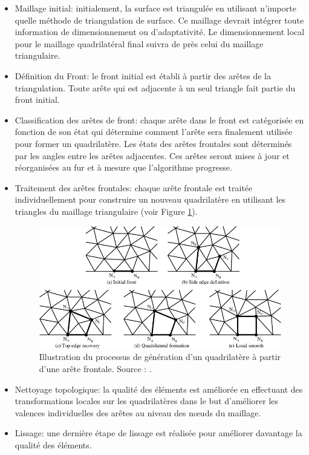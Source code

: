 \begin{itemize}
    \item Maillage initial: initialement, la surface est triangulée en utilisant n'importe quelle méthode de triangulation de surface. Ce maillage devrait intégrer toute information de dimensionnement ou d'adaptativité. Le dimensionnement local pour le maillage quadrilatéral final suivra de près celui du maillage triangulaire.\\

    \item Définition du Front: le front initial est établi à partir des arêtes de la triangulation. Toute arête qui est adjacente à un seul triangle fait partie du front initial.\\

    \item Classification des arêtes de front: chaque arête dans le front est catégorisée en fonction de son état qui détermine comment l'arête sera finalement utilisée pour former un quadrilatère. Les états des arêtes frontales sont déterminés par les angles entre les arêtes adjacentes. Ces arêtes seront mises à jour et réorganisées au fur et à mesure que l'algorithme progresse.\\

    \item Traitement des arêtes frontales: chaque arête frontale est traitée individuellement pour construire un nouveau quadrilatère en utilisant les triangles du maillage triangulaire (voir Figure \ref{fig:step_front_advancing}).

    \begin{figure}[!h]
    \centering
    \includegraphics[scale=0.62]{images/step_front_advancing.png}
    \caption{Illustration du processus de génération d'un quadrilatère à partir d'une arête frontale. Source : \cite{owen1999q}.}
    \label{fig:step_front_advancing}
    \end{figure}

    \item Nettoyage topologique: la qualité des éléments est améliorée en effectuant des transformations locales sur les quadrilatères dans le but d'améliorer les valences individuelles des arêtes au niveau des nœuds du maillage.\\

    \item Lissage: une dernière étape de lissage est réalisée pour améliorer davantage la qualité des éléments.\\
\end{itemize}


